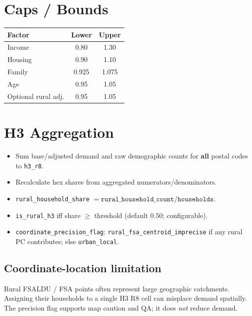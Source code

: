 \documentclass[10pt]{article}
\begin{document}
\section{Caps / Bounds}
\begin{center}
\small
\begin{tabular}{@{}lcc@{}}
\toprule
Factor & Lower & Upper \\
\midrule
Income & 0.80 & 1.30 \\
Housing & 0.90 & 1.10 \\
Family & 0.925 & 1.075 \\
Age & 0.95 & 1.05 \\
Optional rural adj. & 0.95 & 1.05 \\
\bottomrule
\end{tabular}
\end{center}

\section{H3 Aggregation}
\begin{itemize}
  \item Sum base/adjusted demand and raw demographic counts for \textbf{all} postal codes to \texttt{h3\_r8}.
  \item Recalculate hex shares from aggregated numerators/denominators.
  \item \texttt{rural\_household\_share} $= \texttt{rural\_household\_count}/\texttt{households}$.
  \item \texttt{is\_rural\_h3} iff share $\ge$ threshold (default $0.50$; configurable).
  \item \texttt{coordinate\_precision\_flag}: \texttt{rural\_fsa\_centroid\_imprecise} if any rural PC contributes; else \texttt{urban\_local}.
\end{itemize}

\subsection*{Coordinate-location limitation}
Rural FSALDU / FSA points often represent large geographic catchments. Assigning their households to a single H3 R8 cell can misplace demand spatially. The precision flag supports map caution and QA; it does \emph{not} reduce demand.
\end{document}
